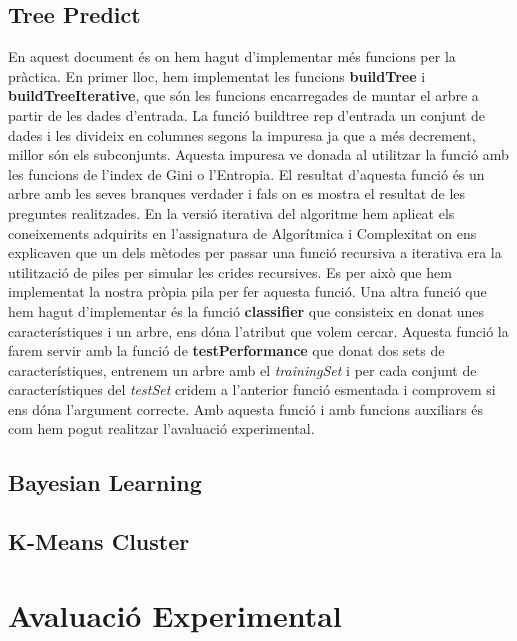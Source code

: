 \documentclass[11pt]{article}
\begin{document}
	\subsection{Tree Predict}
		En aquest document és on hem hagut d'implementar més funcions per la pràctica. En primer lloc, hem implementat les funcions \textbf{buildTree} i \textbf{buildTreeIterative}, que són les funcions encarregades de muntar el arbre a partir de les dades d'entrada. La funció buildtree rep d'entrada un conjunt de dades i les divideix en columnes segons la impuresa ja que a més decrement, millor són els subconjunts. Aquesta impuresa ve donada al utilitzar la funció amb les funcions de l'index de Gini o l'Entropia. El resultat d'aquesta funció és un arbre amb les seves branques verdader i fals on es mostra el resultat de les preguntes realitzades. En la versió iterativa del algoritme hem aplicat els coneixements adquirits en l'assignatura de Algorítmica i Complexitat on ens explicaven que un dels mètodes per passar una funció recursiva a iterativa era la utilització de piles per simular les crides recursives. Es per això que hem implementat la nostra pròpia pila per fer aquesta funció. Una altra funció que hem hagut d'implementar és la funció \textbf{classifier} que consisteix en donat unes característiques i un arbre, ens dóna l'atribut que volem cercar. Aquesta funció la farem servir amb la funció de \textbf{testPerformance} que donat dos sets de característiques, entrenem un arbre amb el \textit{trainingSet} i per cada conjunt de característiques del \textit{testSet} cridem a l'anterior funció esmentada i comprovem si ens dóna l'argument correcte. Amb aquesta funció i amb funcions auxiliars és com hem pogut realitzar l'avaluació experimental.
		
	\subsection{Bayesian Learning}
		
	\subsection{K-Means Cluster}

\section{Avaluació Experimental}
\end{document}
